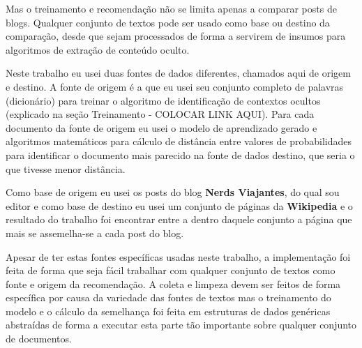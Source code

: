 Mas o treinamento e recomendação não se limita apenas a comparar posts de blogs. Qualquer conjunto de textos pode ser usado como base ou destino da comparação, desde que sejam processados de forma a servirem de insumos para algoritmos de extração de conteúdo oculto.

Neste trabalho eu usei duas fontes de dados diferentes, chamados aqui de origem e destino. A fonte de origem é a que eu usei seu conjunto completo de palavras (dicionário) para treinar o algoritmo de identificação de contextos ocultos (explicado na seção Treinamento - COLOCAR LINK AQUI). Para cada documento da fonte de origem eu usei o modelo de aprendizado gerado e algoritmos matemáticos para cálculo de distância entre valores de probabilidades para identificar o documento mais parecido na fonte de dados destino, que seria o que tivesse menor distância.

Como base de origem eu usei os posts do blog \textbf{Nerds Viajantes}, do qual sou editor e como base de destino eu usei um conjunto de páginas da \textbf{Wikipedia} e o resultado do trabalho foi encontrar entre a dentro daquele conjunto a página que mais se assemelha-se a cada post do blog.

Apesar de ter estas fontes específicas usadas neste trabalho, a implementação foi feita de forma que seja fácil trabalhar com qualquer conjunto de textos como fonte e origem da recomendação. A coleta e limpeza devem ser feitos de forma específica por causa da variedade das fontes de textos mas o treinamento do modelo e o cálculo da semelhança foi feita em estruturas de dados genéricas abstraídas de forma a executar esta parte tão importante sobre qualquer conjunto de documentos.   
